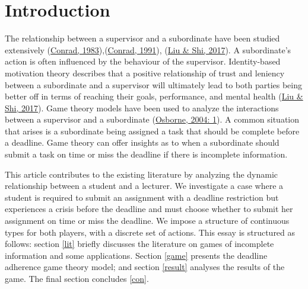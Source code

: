 \documentclass[11pt,preprint, authoryear]{elsarticle}
\numberwithin{equation}{section}
\numberwithin{figure}{section}
\numberwithin{table}{section}
\begin{document}
\renewcommand{\contentsname}{Table of Contents}
{\tableofcontents}

\pagestyle{fancy}
\chead{}
\rhead{}
\lfoot{}
\lhead{}
\cfoot{}


\headsep 35pt %




\newpage

\hypertarget{introduction}{%
\section{\texorpdfstring{Introduction
\label{intro}}{Introduction }}\label{introduction}}

The relationship between a supervisor and a subordinate have been
studied extensively (\protect\hyperlink{ref-power}{Conrad,
1983}),(\protect\hyperlink{ref-comm}{Conrad, 1991}),
(\protect\hyperlink{ref-trust}{Liu \& Shi, 2017}). A subordinate's
action is often influenced by the behaviour of the supervisor.
Identity-based motivation theory describes that a positive relationship
of trust and leniency between a subordinate and a supervisor will
ultimately lead to both parties being better off in terms of reaching
their goals, performance, and mental health
(\protect\hyperlink{ref-trust}{Liu \& Shi, 2017}). Game theory models
have been used to analyze the interactions between a supervisor and a
subordinate (\protect\hyperlink{ref-book}{Osborne, 2004: 1}). A common
situation that arises is a subordinate being assigned a task that should
be complete before a deadline. Game theory can offer insights as to when
a subordinate should submit a task on time or miss the deadline if there
is incomplete information.

This article contributes to the existing literature by analyzing the
dynamic relationship between a student and a lecturer. We investigate a
case where a student is required to submit an assignment with a deadline
restriction but experiences a crisis before the deadline and must choose
whether to submit her assignment on time or miss the deadline. We impose
a structure of continuous types for both players, with a discrete set of
actions. This essay is structured as follows: section \ref{lit} briefly
discusses the literature on games of incomplete information and some
applications. Section \ref{game} presents the deadline adherence game
theory model; and section \ref{result} analyses the results of the game.
The final section concludes \ref{con}.
\end{document}
